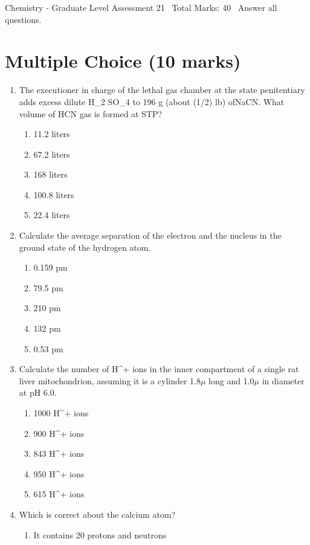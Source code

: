 \documentclass[12pt]{article}
\begin{document}
\begin{center}
Chemistry - Graduate Level Assessment 21 \
Total Marks: 40 \
Answer all questions.
\end{center}

\section*{Multiple Choice (10 marks)}
\begin{enumerate}[label=\arabic*.]
\item The executioner in charge of the lethal gas chamber at the state penitentiary adds excess dilute H\_2 SO\_4 to 196 g (about (1/2) lb) ofNaCN. What volume of HCN gas is formed at STP?
\begin{enumerate}[label=(\alph*)]
    \item 11.2 liters
    \item 67.2 liters
    \item 168 liters
    \item 100.8 liters
    \item 22.4 liters
\end{enumerate}
\item Calculate the average separation of the electron and the nucleus in the ground state of the hydrogen atom.
\begin{enumerate}[label=(\alph*)]
    \item 0.159 pm
    \item 79.5 pm
    \item 210 pm
    \item 132 pm
    \item 0.53 pm
\end{enumerate}
\item Calculate the number of H^+ ions in the inner compartment of a single rat liver mitochondrion, assuming it is a cylinder 1.8\ensuremath{\mu} long and 1.0\ensuremath{\mu} in diameter at pH 6.0.
\begin{enumerate}[label=(\alph*)]
    \item 1000 H^+ ions
    \item 900 H^+ ions
    \item 843 H^+ ions
    \item 950 H^+ ions
    \item 615 H^+ ions
\end{enumerate}
\item Which is correct about the calcium atom?
\begin{enumerate}[label=(\alph*)]
    \item It contains 20 protons and neutrons

\end{enumerate}
\end{enumerate}
\end{document}

